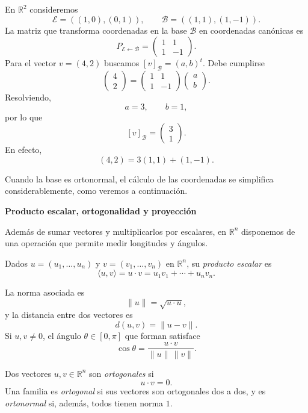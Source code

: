 \begin{example}
En $\mathbb{R}^2$ consideremos
\[
\mathcal E=((1,0),(0,1)),
\qquad
\mathcal B=((1,1),(1,-1)).
\]
La matriz que transforma coordenadas en la base $\mathcal B$ en coordenadas canónicas es
\[
P_{\mathcal E\leftarrow\mathcal B}
=
\begin{pmatrix}
1&1\\
1&-1
\end{pmatrix}.
\]
Para el vector $v=(4,2)$ buscamos $[v]_{\mathcal B}=(a,b)^t$. Debe cumplirse
\[
\begin{pmatrix}4\\2\end{pmatrix}
=
\begin{pmatrix}1&1\\1&-1\end{pmatrix}
\begin{pmatrix}a\\b\end{pmatrix}.
\]
Resolviendo,
\[
a=3,\qquad b=1,
\]
por lo que
\[
\boxed{[v]_{\mathcal B}=\begin{pmatrix}3\\1\end{pmatrix}.}
\]
En efecto,
\[
(4,2)=3(1,1)+(1,-1).
\]
\end{example}

Cuando la base es ortonormal, el cálculo de las coordenadas se simplifica considerablemente, como veremos a continuación.

\textbf{Producto escalar, ortogonalidad y proyección}

Además de sumar vectores y multiplicarlos por escalares, en $\mathbb{R}^n$ disponemos de una operación que permite medir longitudes y ángulos.

\begin{definition}
Dados $u=(u_1,\ldots,u_n)$ y $v=(v_1,\ldots,v_n)$ en $\mathbb{R}^n$, su \emph{producto escalar} es
\[
\langle u,v\rangle
=u\cdot v
=u_1v_1+\cdots+u_nv_n.
\]
\end{definition}

La norma asociada es
\[
\|u\|=\sqrt{u\cdot u},
\]
y la distancia entre dos vectores es
\[
d(u,v)=\|u-v\|.
\]
Si $u,v\neq0$, el ángulo $\theta\in[0,\pi]$ que forman satisface
\[
\cos\theta
=\frac{u\cdot v}{\|u\|\,\|v\|}.
\]

\begin{definition}[Ortogonalidad]
Dos vectores $u,v\in\mathbb{R}^n$ son \emph{ortogonales} si
\[
u\cdot v=0.
\]
Una familia es \emph{ortogonal} si sus vectores son ortogonales dos a dos, y es \emph{ortonormal} si, además, todos tienen norma $1$.
\end{definition}


